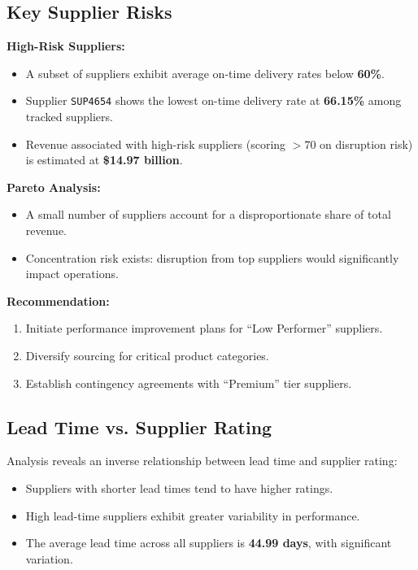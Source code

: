 \documentclass[11pt,a4paper]{article}
\begin{document}
\subsection{Key Supplier Risks}

\textbf{High-Risk Suppliers:}
\begin{itemize}[leftmargin=1.5em]
    \item A subset of suppliers exhibit average on-time delivery rates below \textbf{60\%}.
    \item Supplier \texttt{SUP4654} shows the lowest on-time delivery rate at \textbf{66.15\%} among tracked suppliers.
    \item Revenue associated with high-risk suppliers (scoring $>70$ on disruption risk) is estimated at \textbf{\$14.97 billion}.
\end{itemize}

\textbf{Pareto Analysis:}
\begin{itemize}[leftmargin=1.5em]
    \item A small number of suppliers account for a disproportionate share of total revenue.
    \item Concentration risk exists: disruption from top suppliers would significantly impact operations.
\end{itemize}

\textbf{Recommendation:}
\begin{enumerate}[leftmargin=1.5em]
    \item Initiate performance improvement plans for ``Low Performer'' suppliers.
    \item Diversify sourcing for critical product categories.
    \item Establish contingency agreements with ``Premium'' tier suppliers.
\end{enumerate}

\subsection{Lead Time vs. Supplier Rating}

Analysis reveals an inverse relationship between lead time and supplier rating:

\begin{itemize}[leftmargin=1.5em]
    \item Suppliers with shorter lead times tend to have higher ratings.
    \item High lead-time suppliers exhibit greater variability in performance.
    \item The average lead time across all suppliers is \textbf{44.99 days}, with significant variation.
\end{itemize}
\end{document}
